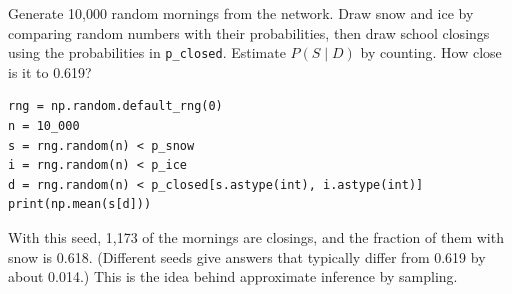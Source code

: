 \begin{Exercise}[label=bn6, title={Learn by simulating}]
Generate 10,000 random mornings from the network. Draw snow and ice by comparing random numbers with their
probabilities, then draw school closings using the probabilities in \verb|p_closed|. Estimate $P(S \mid D)$ by counting. How close is it to 0.619?
\end{Exercise}
\begin{Answer}[ref=bn6]
\begin{verbatim}
rng = np.random.default_rng(0)
n = 10_000
s = rng.random(n) < p_snow
i = rng.random(n) < p_ice
d = rng.random(n) < p_closed[s.astype(int), i.astype(int)]
print(np.mean(s[d]))
\end{verbatim}
With this seed, 1,173 of the mornings are closings, and the fraction of them with snow is 0.618. (Different
seeds give answers that typically differ from 0.619 by about 0.014.) This is the idea behind
approximate inference by sampling.
\end{Answer}
